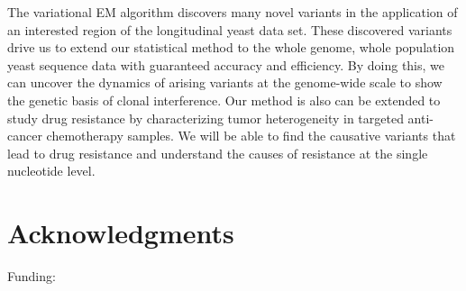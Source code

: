 \documentclass[11pt,reqno]{amsart}
\begin{document}
The variational EM algorithm discovers many novel variants in the application of an interested region of the longitudinal yeast data set.
These discovered variants drive us to extend our statistical method to the whole genome, whole population yeast sequence data with guaranteed accuracy and efficiency.
By doing this, we can uncover the dynamics of arising variants at the genome-wide scale to show the genetic basis of clonal interference.
Our method is also can be extended to study drug resistance by characterizing tumor heterogeneity in targeted anti-cancer chemotherapy samples.
We will be able to find the causative variants that lead to drug resistance and understand the causes of resistance at the single nucleotide level.
\section{Acknowledgments}
Funding:
%
\appendix
\end{document}
